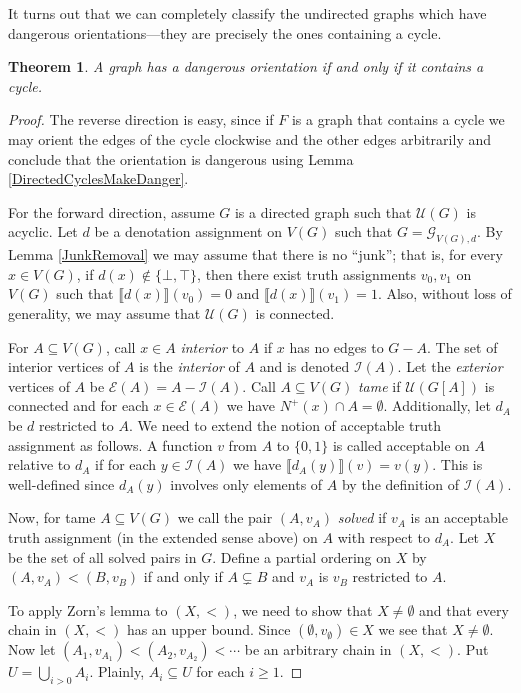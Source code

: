 \documentclass[12pt]{kluwer}
\newtheorem{thm}{Theorem}
\theoremstyle{remark}
\newcommand{\fancy}[1]{\mathcal{#1}}
\def\G{\fancy{G}}
\def\I{\fancy{I}}
\def\U{\fancy{U}}
\def\E{\fancy{E}}
\begin{document}
It turns out that we can completely classify the undirected graphs which have dangerous orientations---they are precisely the ones containing a cycle.

\begin{thm}\label{OrientationDangerous}
A graph has a dangerous orientation if and only if it contains a cycle.
\end{thm}
\begin{proof}
The reverse direction is easy, since if $F$ is a graph that contains a cycle we may orient the edges of the cycle clockwise and the other edges arbitrarily and conclude that the orientation is dangerous using Lemma \ref{DirectedCyclesMakeDanger}.

For the forward direction, assume $G$ is a directed graph such that $\U(G)$ is acyclic. Let $d$ be a denotation assignment on $V(G)$ such that $G = \G_{V(G), d}$.  By Lemma \ref{JunkRemoval} we may assume that there is no ``junk''; that is, for every $x \in V(G)$, if $d(x) \not \in \{\bot, \top\}$, then there exist truth assignments $v_0, v_1$ on $V(G)$ such that $\llbracket d(x)\rrbracket(v_0) = 0$ and  $\llbracket d(x)\rrbracket(v_1) = 1$.   Also, without loss of generality, we may assume that $\U(G)$ is connected.

For $A \subseteq V(G)$, call $x \in A$ \emph{interior} to $A$ if $x$ has no edges to $G - A$.  The set of interior vertices of $A$ is the \emph{interior} of $A$ and is denoted $\I(A)$. Let the \emph{exterior} vertices of $A$ be $\E(A) = A - \I(A)$.  Call $A \subseteq V(G)$ \emph{tame} if $\U(G[A])$ is connected and for each $x \in \E(A)$ we have $N^+(x) \cap A = \emptyset$. Additionally, let $d_A$ be $d$ restricted to $A$.  We need to extend the notion of acceptable truth assignment as follows.  A function $v$ from $A$ to $\{0,1\}$ is called acceptable on $A$ relative to $d_A$ if for each $y \in \I(A)$ we have $\llbracket d_A(y) \rrbracket(v) = v(y)$.  This is well-defined since $d_A(y)$ involves only elements of $A$ by the definition of $\I(A)$.

Now, for tame $A \subseteq V(G)$ we call the pair $(A, v_A)$ \emph{solved} if $v_A$ is an acceptable truth assignment (in the extended sense above) on $A$ with respect to $d_A$.  Let $X$ be the set of all solved pairs in $G$.  Define a partial ordering on $X$ by $(A, v_A) < (B, v_B)$ if and only if $A \subsetneq B$ and $v_A$ is $v_B$ restricted to $A$.

To apply Zorn's lemma to $(X, <)$, we need to show that $X \neq \emptyset$ and that every chain in  $(X, <)$ has an upper bound. Since $(\emptyset, v_\emptyset) \in X$ we see that $X \neq \emptyset$.  Now let $(A_1, v_{A_1}) < (A_2, v_{A_2}) < \cdots$ be an arbitrary chain in $(X, <)$.  Put $U = \bigcup_{i > 0} A_i$.  Plainly, $A_i \subseteq U$ for each $i \geq 1$.


\end{proof}
\end{document}
